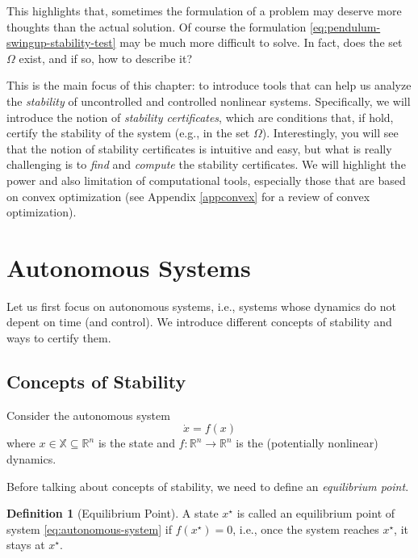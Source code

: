 \documentclass[
]{book}
\theoremstyle{definition}
\newtheorem{definition}{Definition}[chapter]
\theoremstyle{definition}
\theoremstyle{definition}
\theoremstyle{definition}
\theoremstyle{remark}
\begin{document}
This highlights that, sometimes the formulation of a problem may deserve more thoughts than the actual solution. Of course the formulation \eqref{eq:pendulum-swingup-stability-test} may be much more difficult to solve. In fact, does the set \(\Omega\) exist, and if so, how to describe it?

This is the main focus of this chapter: to introduce tools that can help us analyze the \emph{stability} of uncontrolled and controlled nonlinear systems. Specifically, we will introduce the notion of \emph{stability certificates}, which are conditions that, if hold, certify the stability of the system (e.g., in the set \(\Omega\)). Interestingly, you will see that the notion of stability certificates is intuitive and easy, but what is really challenging is to \emph{find} and \emph{compute} the stability certificates. We will highlight the power and also limitation of computational tools, especially those that are based on convex optimization (see Appendix \ref{appconvex} for a review of convex optimization).

\hypertarget{autonomous-systems}{%
\section{Autonomous Systems}\label{autonomous-systems}}

Let us first focus on autonomous systems, i.e., systems whose dynamics do not depent on time (and control). We introduce different concepts of stability and ways to certify them.

\hypertarget{concepts-of-stability}{%
\subsection{Concepts of Stability}\label{concepts-of-stability}}

Consider the autonomous system
\begin{equation}
\dot{x} = f(x)
\label{eq:autonomous-system}
\end{equation}
where \(x \in \mathbb{X} \subseteq \mathbb{R}^n\) is the state and \(f: \mathbb{R}^n \rightarrow \mathbb{R}^n\) is the (potentially nonlinear) dynamics.

Before talking about concepts of stability, we need to define an \emph{equilibrium point}.

\begin{definition}[Equilibrium Point]
\protect\hypertarget{def:equilibriumpoint}{}\label{def:equilibriumpoint}A state \(x^\star\) is called an equilibrium point of system \eqref{eq:autonomous-system} if \(f(x^\star) = 0\), i.e., once the system reaches \(x^\star\), it stays at \(x^\star\).
\end{definition}
\end{document}
